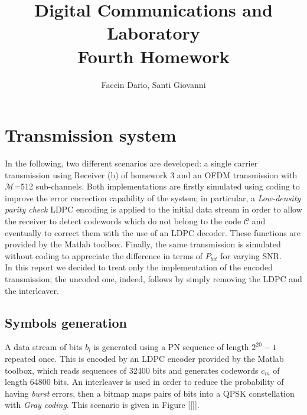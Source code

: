 \documentclass[a4paper, 12pt]{report}
\begin{document}
	
\title{Digital Communications and Laboratory \\ Fourth Homework}
\author{Faccin Dario, Santi Giovanni}
\date{}
\maketitle

\section*{Transmission system}
In the following, two different scenarios are developed: a single carrier transmission using Receiver (b) of homework 3 and an OFDM transmission with $\mathcal{M}$=512 sub-channels. Both implementations are firstly simulated using coding to improve the error correction capability of the system; in particular, a \textit{Low-density parity check} LDPC encoding is applied to the initial data stream in order to allow the receiver to detect codewords which do not belong to the code $\mathcal{C}$ and eventually to correct them with the use of an LDPC decoder. These functions are provided by the Matlab toolbox. Finally, the same transmission is simulated without coding to appreciate the difference in terms of $P_{bit}$ for varying SNR. \\
In this report we decided to treat only the implementation of the encoded transmission; the uncoded one, indeed, follows by simply removing the LDPC and the interleaver.

\subsection*{Symbols generation}
A data stream of bits $b_l$ is generated using a PN sequence of length $2^{20}-1$ repeated once. This is encoded by an LDPC encoder provided by the Matlab toolbox, which reads sequences of 32400 bits and generates codewords $c_m$ of length 64800 bits. An interleaver is used in order to reduce the probability of having \textit{burst} errors, then a bitmap maps pairs of bits into a QPSK constellation with \textit{Gray coding}. This scenario is given in Figure [\ref{}].
\end{document}
